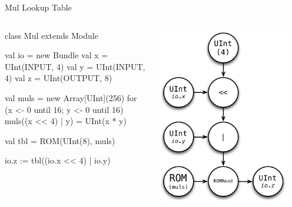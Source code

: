 \documentclass[xcolor=pdflatex,dvipsnames,table]{beamer}
\begin{document}
\begin{frame}[fragile]{Mul Lookup Table}
\begin{columns}

\begin{scala}
class Mul extends Module {
  val io = new Bundle {
    val x   = UInt(INPUT, 4)
    val y   = UInt(INPUT, 4)
    val z   = UInt(OUTPUT, 8) }

  val muls = new Array[UInt](256)
  for (x <- 0 until 16; y <- 0 until 16) 
    muls((x << 4) | y) = UInt(x * y)

  val tbl = ROM(UInt(8), muls)

  io.z := tbl((io.x << 4) | io.y)
}
\end{scala}


\begin{center}
\includegraphics[width=0.9\textwidth]{figs/muls.pdf} 
\end{center}

\end{columns}
\end{frame}
\end{document}
